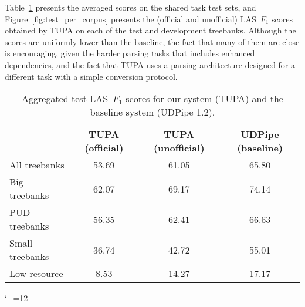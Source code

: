 \documentclass[11pt,a4paper]{article}
\begin{document}
Table~\ref{tab:overall_results} presents the
averaged scores on the shared task test sets,
and Figure~\ref{fig:test_per_corpus} presents the (official and unofficial) LAS~$F_1$
scores obtained by TUPA on each of the test and development treebanks.
Although the scores are uniformly lower than the baseline,
the fact that many of them are close is encouraging,
given the harder parsing tasks that includes enhanced dependencies,
and the fact that TUPA uses a
parsing architecture designed for a different task
with a simple conversion protocol.

\begin{table}
\begin{tabular}{lccc}
\hline
& \multirow{2}{13mm}{\bf TUPA {\small(official)}} & \multirow{2}{13mm}{\bf TUPA {\small(unofficial)}}
& \multirow{2}{13mm}{\bf UDPipe {\small(baseline)}} \\\\
\hline
All treebanks & 53.69 & 61.05 & 65.80 \\
Big treebanks & 62.07 & 69.17 & 74.14 \\
PUD treebanks & 56.35 & 62.41 & 66.63 \\
Small treebanks & 36.74 & 42.72 & 55.01 \\
Low-resource & 8.53 & 14.27 & 17.17
\end{tabular}
\caption{Aggregated test LAS~$F_1$ scores
for our system (TUPA) and the baseline system (UDPipe 1.2).
\label{tab:overall_results}}
\end{table}

\catcode`\_=12
\corpusa
{}\corpusb
{}\corpusc
\end{document}
